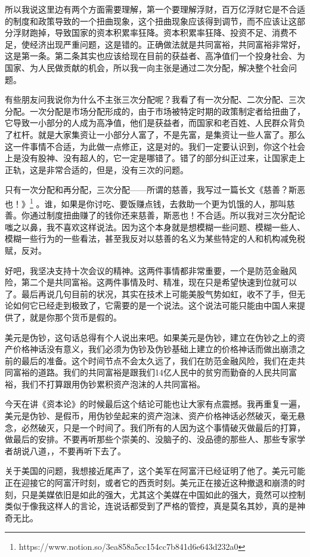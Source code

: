 \documentclass[UTF8, 12pt, a4paper]{ctexrep}
\begin{document}
所以我说这里边有两个方面需要理解，第一个要理解浮财，百万亿浮财它是不合适的制度和政策导致的一个扭曲现象，这个扭曲现象应该得到调节，而不应该让这部分浮财跑掉，导致国家的资本积累率狂降。资本积累率狂降、投资不足、消费不足，使经济出现严重问题，这是错的。正确做法就是共同富裕，共同富裕非常好，这是第一条。第二条其实也应该给现在目前的获益者、高净值们一个投身社会、为国家、为人民做贡献的机会，所以我一向主张是通过二次分配，解决整个社会问题。

有些朋友问我说你为什么不主张三次分配呢？我看了有一次分配、二次分配、三次分配。一次分配是市场分配形成的，由于市场被特定时期的政策制定者给扭曲了，它导致一小部分的人成为高净值，他们是获益者，而国家和老百姓、人民群众背负了杠杆。就是大家集资让一小部分人富了，不是先富，是集资让一些人富了。那么这一件事情不合适，为此做一点修正，这是对的。我们一定要认识到，你这个社会上是没有股神、没有超人的，它一定是哪错了。错了的部分纠正过来，让国家走上正轨，这是非常合适的，但是，没有三次的问题。

只有一次分配和再分配，三次分配——所谓的慈善，我写过一篇长文《慈善？斯恶也！》\footnote{https://www.notion.so/3ea858a5cc154cc7b841d6e643d232a0} 。谁，如果是你讨吃、要饭赚点钱，去救助一个更为饥饿的人，那叫慈善。你通过制度扭曲赚了的钱你还来慈善，斯恶也！不合适。所以我对三次分配论嗤之以鼻，我不喜欢这样说法。因为这个本身就是想模糊一些问题、模糊一些人、模糊一些行为的一些看法，甚至我反对以慈善的名义为某些特定的人和机构减免税赋，反对。

好吧，我坚决支持十次会议的精神。这两件事情都非常重要，一个是防范金融风险，第二个是共同富裕。这两件事情及时、精准，现在只是希望快速到位就可以了。最后再说几句目前的状况，其实在技术上可能美股气势如虹，收不了手，但无论如何它已经走到极致了，它需要的是一个说法。这个说法可能只能由中国人来提供了，就是你那个货币是假的。

美元是伪钞，这句话总得有个人说出来吧。如果美元是伪钞，建立在伪钞之上的资产价格神话没有意义，我们必须为伪钞及伪钞基础上建立的价格神话而做出崩溃之前的最后的准备。这个时间节点不会太久远了，我们在防范金融风险，我们在走共同富裕的道路。我们的共同富裕是跟我们14亿人民中的贫穷而勤奋的人民共同富裕，我们不打算跟用伪钞累积资产泡沫的人共同富裕。

今天在讲《资本论》的时候最后这个结论可能也让大家有点震撼。我再重复一遍，美元是伪钞、是假币，用伪钞垒起来的资产泡沫、资产价格神话必然破灭，毫无悬念，必然破灭，只是一个时间了。我们所有的人因为这个事情破灭做最后的打算，做最后的安排。不要再听那些个崇美的、没脑子的、没品德的那些人、那些专家学者胡说八道，，不要再听下去了。

关于美国的问题，我想接近尾声了，这个美军在阿富汗已经证明了他了。美元可能正在迎接它的阿富汗时刻，或者它的西贡时刻。美元正在接近这种撤退和崩溃的时刻，只是美媒依旧是如此的强大，尤其这个美媒在中国如此的强大，竟然可以控制类似于像我这样人的言论，连说话都受到了严格的管控，真是莫名其妙，真的是神奇无比。
\end{document}
